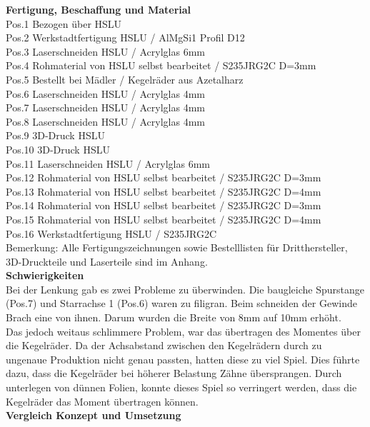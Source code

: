 \newpage
\textbf{Fertigung, Beschaffung und Material}\\[0.2cm]
Pos.1 	Bezogen über HSLU\\
Pos.2 	Werkstadtfertigung HSLU / AlMgSi1 Profil D12\\
Pos.3 	Laserschneiden HSLU / Acrylglas 6mm\\
Pos.4 	Rohmaterial von HSLU selbst bearbeitet / S235JRG2C D=3mm\\
Pos.5 	Bestellt bei Mädler / Kegelräder aus Azetalharz\\
Pos.6 	Laserschneiden HSLU / Acrylglas 4mm\\
Pos.7 	Laserschneiden HSLU / Acrylglas 4mm\\
Pos.8	Laserschneiden HSLU / Acrylglas 4mm\\
Pos.9 	3D-Druck HSLU\\
Pos.10	3D-Druck HSLU\\
Pos.11	Laserschneiden HSLU / Acrylglas 6mm\\
Pos.12	Rohmaterial von HSLU selbst bearbeitet / S235JRG2C D=3mm\\
Pos.13	Rohmaterial von HSLU selbst bearbeitet / S235JRG2C D=4mm\\
Pos.14	Rohmaterial von HSLU selbst bearbeitet / S235JRG2C D=3mm\\
Pos.15	Rohmaterial von HSLU selbst bearbeitet / S235JRG2C D=4mm\\
Pos.16	Werkstadtfertigung HSLU / S235JRG2C\\
Bemerkung: Alle Fertigungszeichnungen sowie Bestelllisten für Dritthersteller, 3D-Druckteile und Laserteile sind im Anhang.\\[0.2cm]
\textbf{Schwierigkeiten}\\[0.2cm]
Bei der Lenkung gab es zwei Probleme zu überwinden. Die baugleiche Spurstange (Pos.7) und Starrachse 1 (Pos.6) waren zu filigran. Beim schneiden der Gewinde Brach eine von ihnen. Darum wurden die Breite von 8mm auf 10mm erhöht.\\
Das jedoch weitaus schlimmere Problem, war das übertragen des Momentes über die Kegelräder. Da der Achsabstand zwischen den Kegelrädern durch zu ungenaue Produktion nicht genau passten, hatten diese zu viel Spiel. Dies führte dazu, dass die Kegelräder bei höherer Belastung Zähne übersprangen. Durch unterlegen von dünnen Folien, konnte dieses Spiel so verringert werden, dass die Kegelräder das Moment übertragen können.\\[0.2cm] 
\textbf{Vergleich Konzept und Umsetzung}\\[0.2cm]
